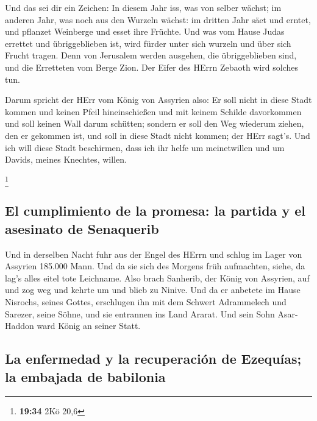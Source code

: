  Und das sei dir ein Zeichen: In diesem Jahr iss, was von
selber wächst; im anderen Jahr, was noch aus den Wurzeln wächst: im
dritten Jahr säet und erntet, und pflanzet Weinberge und esset ihre
Früchte.  Und was vom Hause Judas errettet und
übriggeblieben ist, wird fürder unter sich wurzeln und über sich Frucht
tragen.  Denn von Jerusalem werden ausgehen, die
übriggeblieben sind, und die Erretteten vom Berge Zion. Der Eifer des
HErrn Zebaoth wird solches tun.

 Darum spricht der HErr vom König von Assyrien also: Er
soll nicht in diese Stadt kommen und keinen Pfeil hineinschießen und mit
keinem Schilde davorkommen und soll keinen Wall darum schütten;
 sondern er soll den Weg wiederum ziehen, den er gekommen
ist, und soll in diese Stadt nicht kommen; der HErr sagt's.
 Und ich will diese Stadt beschirmen, dass ich ihr helfe
um meinetwillen und um Davids, meines Knechtes, willen.

\footnote{\textbf{19:34} 2Kö 20,6}

\hypertarget{el-cumplimiento-de-la-promesa-la-partida-y-el-asesinato-de-senaquerib}{%
\subsection{El cumplimiento de la promesa: la partida y el asesinato de
Senaquerib}\label{el-cumplimiento-de-la-promesa-la-partida-y-el-asesinato-de-senaquerib}}

 Und in derselben Nacht fuhr aus der Engel des HErrn und
schlug im Lager von Assyrien 185.000 Mann. Und da sie sich des Morgens
früh aufmachten, siehe, da lag's alles eitel tote Leichname.
 Also brach Sanherib, der König von Assyrien, auf und zog
weg und kehrte um und blieb zu Ninive.  Und da er
anbetete im Hause Nisrochs, seines Gottes, erschlugen ihn mit dem
Schwert Adrammelech und Sarezer, seine Söhne, und sie entrannen ins Land
Ararat. Und sein Sohn Asar-Haddon ward König an seiner Statt.

\hypertarget{la-enfermedad-y-la-recuperaciuxf3n-de-ezequuxedas-la-embajada-de-babilonia}{%
\subsection{La enfermedad y la recuperación de Ezequías; la embajada de
babilonia}\label{la-enfermedad-y-la-recuperaciuxf3n-de-ezequuxedas-la-embajada-de-babilonia}}

